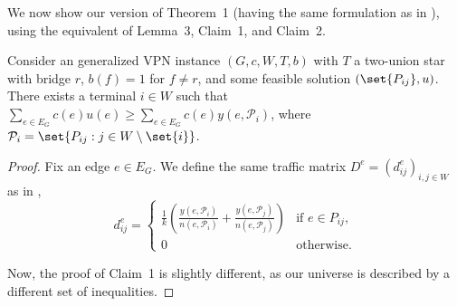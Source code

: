 We now show our version of Theorem~1 (having the same formulation as in \cite{grandoni2008short}), using the equivalent of Lemma~3, Claim~1, and Claim~2.

\renewcommand\thelemma{3}
\begin{lemma}
    Consider an generalized VPN instance $(G, c, W, T, b)$ with $T$ a two-union star with bridge $r$, $b(f) = 1$ for $f \neq r$, and some feasible solution $(\set{P_{ij}}, u)$.
    There exists a terminal $i \in W$ such that $\sum_{e \in E_G} c(e) u(e) \ge \sum_{e \in E_G} c(e) y(e, \mathcal P_i)$, where $\mathcal P_i = \set{P_{ij} : j \in W \setminus \set{i}}$.
\end{lemma}
\begin{proof}
    Fix an edge $e \in E_G$.
    We define the same traffic matrix $D^e = (d^e_{ij})_{i,j \in W}$ as in \cite{grandoni2008short},
    \[
        d^e_{ij} = \begin{cases}
                       \frac 1 k \left( \frac{y(e, \mathcal P_i)}{n(e, \mathcal P_i)} + \frac{y(e, \mathcal P_j)}{n(e, \mathcal P_j)} \right) & \text{if $e \in P_{ij}$,} \\
                       0 & \text{otherwise.}
        \end{cases}
    \]

    Now, the proof of Claim~1 is slightly different, as our universe is described by a different set of inequalities.


\end{proof}
